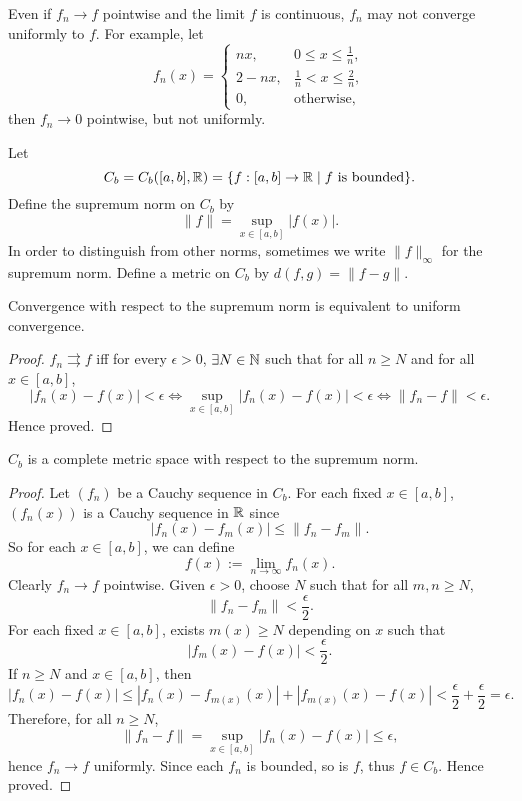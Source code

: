 \begin{rmk}
    Even if $f_n \to f$ pointwise and the limit $f$ is continuous, $f_n$ may not converge uniformly to $f$. For example, let
    \[
    f_n(x) = \begin{cases}
        nx, & 0 \leq x \leq \frac1n, \\
        2 - nx, & \frac1n < x \leq \frac2n, \\
        0, & \text{otherwise},
    \end{cases}
    \]
    then $f_n \to 0$ pointwise, but not uniformly.
\end{rmk}

Let
\[
C_b = C_b([a, b], {\mathbb R}) = {\left\{{f: [a, b] \to {\mathbb R} \mid \text{$f$ is bounded}}\right\}}.
\]
Define the supremum norm on $C_b$ by
\[
\|f\| = \sup_{x \in [a, b]} |f(x)|.
\]
In order to distinguish from other norms, sometimes we write $\|f\|_\infty$ for the supremum norm. Define a metric on $C_b$ by $d(f, g) = \|f - g\|$.

\begin{prop}
    Convergence with respect to the supremum norm is equivalent to uniform convergence.
    \begin{proof}
        $f_n \rightrightarrows f$ iff for every $\epsilon > 0$, $\exists N \in {\mathbb N}$ such that for all $n \geq N$ and for all $x \in [a, b]$,
        \[
        |f_n(x) - f(x)| < \epsilon \iff \sup_{x \in [a, b]} |f_n(x) - f(x)| < \epsilon \iff \|f_n - f\| < \epsilon.
        \]
        Hence proved.
    \end{proof}
\end{prop}

\begin{thm}
    $C_b$ is a complete metric space with respect to the supremum norm.
    \begin{proof}
        Let $(f_n)$ be a Cauchy sequence in $C_b$. For each fixed $x \in [a, b]$, $(f_n(x))$ is a Cauchy sequence in ${\mathbb R}$ since
        \[
        |f_n(x) - f_m(x)| \leq \|f_n - f_m\|.
        \]
        So for each $x \in [a, b]$, we can define
        \[
        f(x) := \lim_{n \to \infty} f_n(x).
        \]
        Clearly $f_n \to f$ pointwise. Given $\epsilon > 0$, choose $N$ such that for all $m, n \geq N$,
        \[
        \|f_n - f_m\| < \frac{\epsilon}{2}.
        \]
        For each fixed $x \in [a, b]$, exists $m(x) \geq N$ depending on $x$ such that
        \[
        |f_m(x) - f(x)| < \frac{\epsilon}{2}.
        \]
        If $n \geq N$ and $x \in [a, b]$, then
        \[
        |f_n(x) - f(x)| \leq |f_n(x) - f_{m(x)}(x)| + |f_{m(x)}(x) - f(x)| < \frac{\epsilon}{2} + \frac{\epsilon}{2} = \epsilon.
        \]
        Therefore, for all $n \geq N$,
        \[
        \|f_n - f\| = \sup_{x \in [a, b]} |f_n(x) - f(x)| \leq \epsilon,
        \]
        hence $f_n \to f$ uniformly. Since each $f_n$ is bounded, so is $f$, thus $f \in C_b$. Hence proved.
    \end{proof}
\end{thm}

